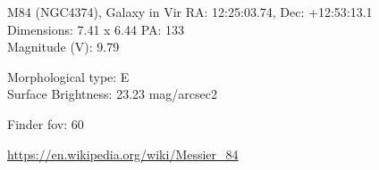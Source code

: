 \begin{block}{M84 (NGC4374), Galaxy in Vir}
    RA: 12:25:03.74, Dec: +12:53:13.1 \\ 
    Dimensions: 7.41 x 6.44 PA: 133 \\ 
    Magnitude (V): 9.79

    Morphological type: E \\ 
    Surface Brightness: 23.23 mag/arcsec2 


    Finder fov: 60 

    \url{https://en.wikipedia.org/wiki/Messier_84} 
\end{block}